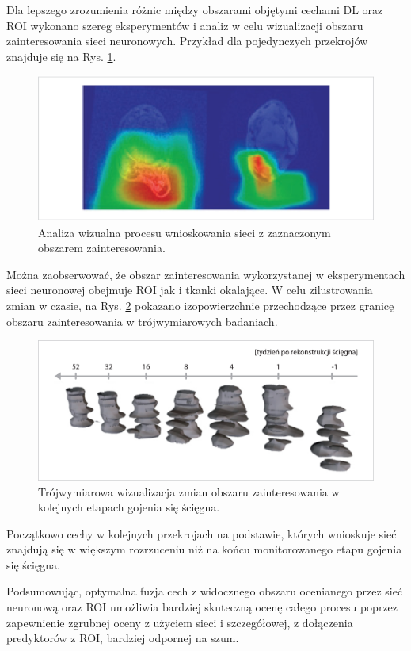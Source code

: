 Dla lepszego zrozumienia różnic między obszarami objętymi cechami DL oraz ROI wykonano szereg eksperymentów i analiz w celu wizualizacji obszaru zainteresowania sieci neuronowych. Przykład dla pojedynczych przekrojów znajduje się \linebreak na Rys. \ref{fig:XAI}.  
\begin{figure}[h!]
	\centering
	\includegraphics[width=1\textwidth]{figures/XAI.jpg}
	\caption{Analiza wizualna procesu wnioskowania sieci z zaznaczonym obszarem zainteresowania.}\label{fig:XAI}
\end{figure}
Można zaobserwować, że obszar zainteresowania wykorzystanej w eksperymentach sieci neuronowej obejmuje ROI jak i tkanki okalające. W celu zilustrowania zmian w czasie, na Rys. \ref{fig:3DXAI} pokazano izopowierzchnie przechodzące przez granicę obszaru zainteresowania w trójwymiarowych badaniach.
\begin{figure}[]
	\centering
	\includegraphics[width=1\textwidth]{figures/3DXAI.jpg}
	\caption{Trójwymiarowa wizualizacja zmian obszaru zainteresowania w kolejnych etapach gojenia się ścięgna.}\label{fig:3DXAI}
\end{figure}
Początkowo cechy w kolejnych przekrojach na podstawie, których wnioskuje sieć znajdują się w większym rozrzuceniu niż na końcu monitorowanego etapu gojenia się ścięgna.

Podsumowując, optymalna fuzja cech z widocznego obszaru ocenianego przez sieć neuronową oraz ROI umożliwia bardziej skuteczną ocenę całego procesu poprzez zapewnienie zgrubnej oceny z użyciem sieci i szczegółowej, z dołączenia predyktorów z ROI, bardziej odpornej na szum. 


